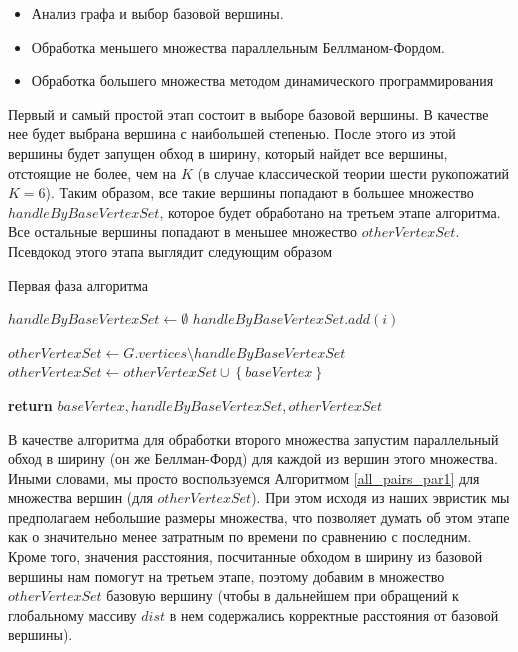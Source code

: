 \begin{itemize}
  \item Анализ графа и выбор базовой вершины. 
  \item Обработка меньшего множества параллельным Беллманом-Фордом.
  \item Обработка большего множества методом динамического программирования
\end{itemize}

Первый и самый простой этап состоит в выборе базовой вершины. В качестве нее будет выбрана вершина с наибольшей степенью. После этого из этой вершины будет запущен обход в ширину, который найдет все вершины, отстоящие не более, чем на $K$ (в случае классической теории шести рукопожатий $K = 6$). Таким образом, все такие вершины попадают в большее множество $handleByBaseVertexSet$, которое будет обработано на третьем этапе алгоритма. Все остальные вершины попадают в меньшее множество $otherVertexSet$. Псевдокод этого этапа выглядит следующим образом

\FloatBarrier
\begin{algorithm}
\caption{Первая фаза алгоритма}\label{all_pairs_social1}
\begin{algorithmic}[1]
\State $handleByBaseVertexSet \gets \emptyset$
\algrenewcommand{} 
\algrenewcommand{}
		\State $handleByBaseVertexSet.add(i)$
	\EndIf
\EndFor

\State $otherVertexSet \gets G.vertices \setminus handleByBaseVertexSet$
\State $otherVertexSet \gets otherVertexSet \cup  \left\{ {baseVertex}\right\}$
 
\State \textbf{return} $ baseVertex, handleByBaseVertexSet, otherVertexSet$
\EndProcedure

\end{algorithmic}
\end{algorithm}




В качестве алгоритма для обработки второго множества запустим параллельный обход в ширину (он же Беллман-Форд) для каждой из вершин этого множества. Иными словами, мы просто воспользуемся Алгоритмом \ref{all_pairs_par1} для множества вершин (для $otherVertexSet$). При этом исходя из наших эвристик мы предполагаем небольшие размеры множества, что позволяет думать об этом этапе как о значительно менее затратным по времени по сравнению с последним. Кроме того, значения расстояния, посчитанные обходом в ширину из базовой вершины нам помогут на третьем этапе, поэтому добавим в множество $otherVertexSet$ базовую вершину (чтобы в дальнейшем при обращений к глобальному массиву $dist$ в нем содержались корректные расстояния от базовой вершины).

